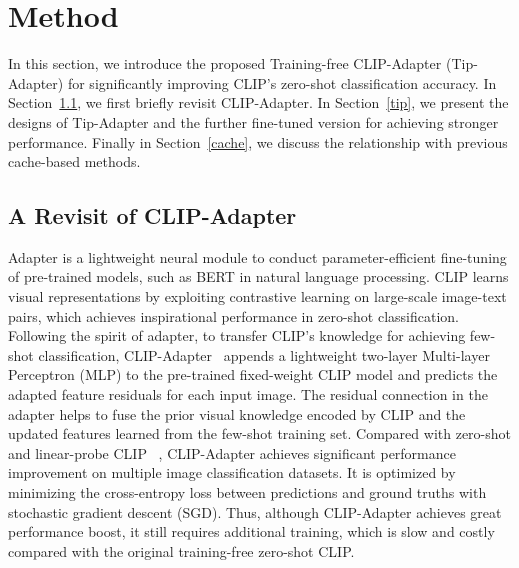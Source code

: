 \documentclass[10pt,twocolumn,letterpaper]{article}
\begin{document}
\section{Method}
\label{sec:method}
In this section, we introduce the proposed Training-free CLIP-Adapter (Tip-Adapter) for significantly improving CLIP's zero-shot classification accuracy. In Section~\ref{adapter}, we first briefly revisit CLIP-Adapter. In Section~\ref{tip}, we present the designs of Tip-Adapter and the further fine-tuned version for achieving stronger performance. Finally in Section~\ref{cache}, we discuss the relationship with previous cache-based methods.

\subsection{A Revisit of CLIP-Adapter}
\label{adapter}

Adapter \cite{houlsby2019parameter} is a lightweight neural module to conduct parameter-efficient fine-tuning of pre-trained models, such as BERT \cite{devlin2018bert} in natural language processing. 
CLIP learns visual representations by exploiting contrastive learning on large-scale image-text pairs, which achieves inspirational performance in zero-shot classification. Following the spirit of adapter, to transfer CLIP's knowledge for achieving few-shot classification, CLIP-Adapter~\cite{gao2021clip} appends a lightweight two-layer Multi-layer Perceptron (MLP) to the pre-trained fixed-weight CLIP model and predicts the adapted feature residuals for each input image. %
The residual connection in the adapter helps to fuse the prior visual knowledge encoded by CLIP and the updated features learned from the few-shot training set.
Compared with zero-shot and linear-probe CLIP ~\cite{radford2021learning}, CLIP-Adapter achieves significant performance improvement on multiple image classification datasets. It is optimized by minimizing the cross-entropy loss between predictions and ground truths with stochastic gradient descent (SGD). Thus, although CLIP-Adapter achieves great performance boost, it still requires additional training, which is slow and costly compared with the original training-free zero-shot CLIP.
\end{document}
